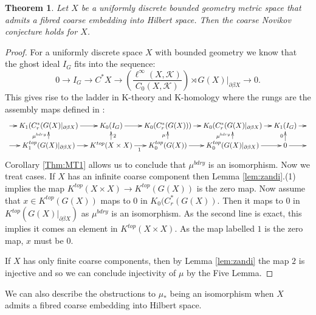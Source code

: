 \documentclass[11pt]{amsart}
\theoremstyle{plain}
\newtheorem{theorem}{Theorem}%
\theoremstyle{definition}%
\theoremstyle{remark}%
\begin{document}
{\begin{theorem}\label{thm:mcor1}
Let $X$ be a uniformly discrete bounded geometry metric space that admits a fibred coarse embedding into Hilbert space. Then the coarse Novikov conjecture holds for $X$.
\end{theorem}
\begin{proof}
For a uniformly discrete space $X$ with bounded geometry we know that the ghost ideal $I_{G}$ fits into the sequence:
\begin{equation*}
0 \rightarrow I_{G} \rightarrow C^{*}X \rightarrow (\frac{\ell^{\infty}(X,\mathcal{K})}{C_{0}(X,\mathcal{K})})\rtimes G(X)|_{\partial\beta X} \rightarrow 0.
\end{equation*}
This gives rise to the ladder in K-theory and K-homology where the rungs are the assembly maps defined in \cite{mypub1}:
$$
\xymatrix@=1em{
\ar[r] & K_{1}(C^{*}_{r}(G(X)|_{\partial\beta X}) \ar[r] & K_{0}(I_{G}) \ar[r]& K_{0}(C^{*}_{r}(G(X))) \ar[r]& K_{0}(C^{*}_{r}(G(X)|_{\partial\beta X})\ar[r] & K_{1}(I_{G}) \ar[r] & \\
\ar[r] & K_{1}^{top}(G(X)|_{\partial\beta X}) \ar[r] \ar[u]^{\mu^{bdry}}& K^{top}(X \times X) \ar[r]_{1}\ar[u]_{2}& K_{0}^{top}(G(X)) \ar[r]\ar[u]^{\mu}& K_{0}^{top}(G(X)|_{\partial\beta X}) \ar[r]\ar[u]^{\mu^{bdry}}& 0\ar[u]^{0} \ar[r] &
}
$$
Corollary \ref{Thm:MT1} allows us to conclude that $\mu^{bdry}$ is an isomorphism. Now we treat cases. If $X$ has an infinite coarse component then Lemma \ref{lem:zandi}.(1) implies the map $K^{top}(X\times X) \rightarrow K^{top}(G(X))$ is the zero map. Now assume that $x \in K^{top}(G(X))$ maps to $0$ in $K_{0}(C^{*}_{r}(G(X))$. Then it maps to $0$ in $K^{top}(G(X)|_{\partial\beta X})$ as $\mu^{bdry}$ is an isomorphism. As the second line is exact, this implies it comes an element in $K^{top}(X\times X)$. As the map labelled $1$ is the zero map, $x$ must be $0$.

If $X$ has only finite coarse components, then by Lemma \ref{lem:zandi} the map $2$ is injective and so we can conclude injectivity of $\mu$ by the Five Lemma.
\end{proof}

We can also describe the obstructions to $\mu_{*}$ being an isomorphism when $X$ admits a fibred coarse embedding into Hilbert space.

}
\end{document}
